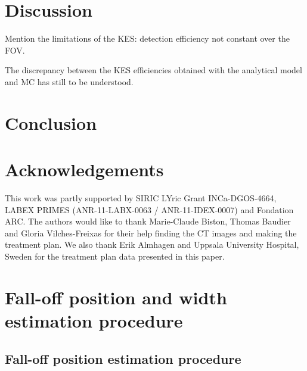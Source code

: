 \documentclass[a4paper,english]{article}
\begin{document}
\section{Discussion}

Mention the limitations of the KES: detection efficiency not constant over the FOV.

The discrepancy between the KES efficiencies obtained with the analytical model and MC has still to be understood.



\section{Conclusion}


\section{Acknowledgements}

This work was partly supported by SIRIC LYric Grant INCa-DGOS-4664, LABEX PRIMES (ANR-11-LABX-0063 / ANR-11-IDEX-0007) and Fondation ARC. The authors would like to thank Marie-Claude Biston, Thomas Baudier and Gloria Vilches-Freixas for their help finding the CT images and making the treatment plan. We also thank Erik Almhagen and Uppsala University Hospital, Sweden for the treatment plan data presented in this paper.

\newpage

\appendix
% 

\section{Fall-off position and width estimation procedure}\label{sec:fopproc}

\subsection{Fall-off position estimation procedure}
\end{document}
